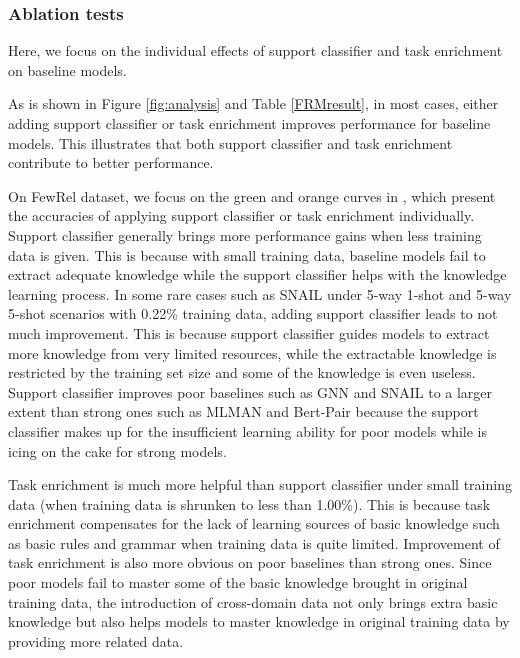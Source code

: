 \subsubsection{Ablation tests}

Here, we focus on the individual effects of support classifier and task enrichment on baseline models. %

As is shown in Figure \ref{fig:analysis} and Table \ref{FRMresult}, in most cases, either adding support classifier or task enrichment improves performance for baseline models.
This illustrates that both support classifier and task enrichment contribute to better performance.

On FewRel dataset, we focus on the green and orange curves in , which present the accuracies of applying support classifier or task enrichment individually.
Support classifier generally brings more performance gains when less training data is given. This is because with small training data, baseline models fail to extract adequate knowledge while the support classifier helps with the knowledge learning process.
In some rare cases such as SNAIL under 5-way 1-shot and 5-way 5-shot scenarios with 0.22\% training data, adding support classifier leads to not much improvement. 
This is because support classifier guides models to extract more knowledge from very limited resources, while the extractable knowledge is restricted by the training set size and some of the knowledge is even useless.
Support classifier improves poor baselines such as GNN and SNAIL to a larger extent than strong ones such as MLMAN and Bert-Pair because the support classifier makes up for the insufficient learning ability for poor models while is icing on the cake for strong models. %

Task enrichment is much more helpful than support classifier under small training data (when training data is shrunken to less than 1.00\%). This is because task enrichment compensates for the lack of learning sources of basic knowledge such as basic rules and grammar when training data is quite limited.
Improvement of task enrichment is also more obvious on poor baselines than strong ones. Since poor models fail to master some of the basic knowledge brought in original training data, the introduction of cross-domain data not only brings extra basic knowledge but also helps models to master knowledge in original training data by providing more related data.

